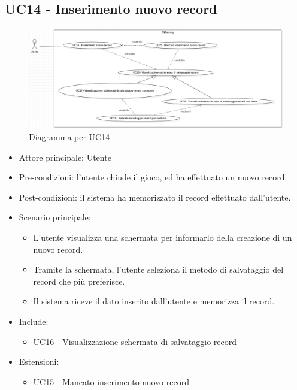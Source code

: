 \subsection{UC14 - Inserimento nuovo record}
\begin{figure}[h]
    \centering
    \includegraphics[width=410pt]{images/usecase/UC14.png}
    \caption{Diagramma per UC14}
    \label{fig:UC14}
\end{figure}
\begin{itemize}
    \item Attore principale: Utente
    \item Pre-condizioni: l'utente chiude il gioco, ed ha effettuato un nuovo record.
    \item Post-condizioni: il sistema ha memorizzato il record effettuato dall'utente.
    \item Scenario principale: \begin{itemize}
        \item L'utente visualizza una schermata per informarlo della creazione di un nuovo record.
        \item Tramite la schermata, l'utente seleziona il metodo di salvataggio del record che più preferisce.
        \item Il sistema riceve il dato inserito dall'utente e memorizza il record.
    \end{itemize}
    \item Include: \begin{itemize}
        \item UC16 - Visualizzazione schermata di salvataggio record
    \end{itemize}
    \item Estensioni: \begin{itemize}
        \item UC15 - Mancato inserimento nuovo record 
    \end{itemize}
\end{itemize}

